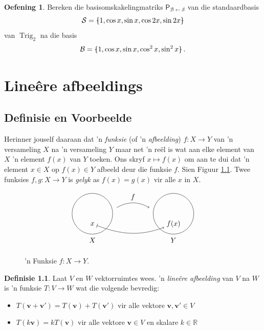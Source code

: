 \documentclass[a4paper,11pt]{book}
\theoremstyle{definition}
\newtheorem{definition}[theorem]{Definisie}
\newtheorem{exercise}{Oefening}
\newcommand{\ve}[1]{\mathbf{#1}}
\newcommand{\mat}[1]{\mathsf{#1}}
\newcommand{\basis}[1]{{\mathcal #1}}
\newcommand{\bmark}{\raisebox{.53ex}{\rule{.2em}{.1ex}}}
\newcommand{\bopen}{{\protect\ooalign{\{\cr\hfil\bmark\hfil\cr}}}
\newcommand{\bclose}{{\protect\ooalign{\}\cr\hfil\bmark\hfil\cr}}}
\DeclareMathOperator{\Trig}{Trig}
\begin{document}
\begin{exercise}
	Bereken die basisomskakelingmatriks $\mat{P}_{\basis{B} \leftarrow
	\basis{S}}$ van die standaardbasis
	\[
		\basis{S} = \bopen 1, \cos x, \sin x, \cos 2x, \sin 2x \bclose 
	\]
	van $\Trig_2$ na die basis 
	\[
		\basis{B} = \bopen 1, \cos x, \sin x, \cos^2 x, \sin^2 x \bclose \,
		.
	\]
\end{exercise}



\chapter{Line{\^e}re afbeeldings} \label{ACh3LinearMaps}

\section{Definisie en Voorbeelde}\label{ACh3Sec1DefinitionsExamples}

Herinner jouself daaraan dat 'n \emph{funksie} (of 'n \emph{afbeelding}) $f
: X \rightarrow Y$ van 'n versameling $X$ na 'n versameling $Y$ maar net
'n re{\"e}l is wat aan elke element van $X$ 'n element $f(x)$ van $Y$
toeken. Ons skryf $x \mapsto f(x)$ om aan te dui dat 'n element $x \in X$
op $f(x) \in Y$ afbeeld deur die funksie $f$.  Sien Figuur
\ref{explanation_of_mapsto}. Twee funksies $f, g : X \rightarrow Y$ is
\emph{gelyk} as $f(x) = g(x)$ vir alle $x$ in $X$. 



\begin{figure}[h]
	\[
		\begin{tikzpicture}
			\draw (-2, 0) circle (1);
			\draw (2,0) circle (1);
			\node at (-2, -1.3) {$X$};
			\node at (2, -1.3) {$Y$};
			\draw[->] (-0.8, 0.3) to[out=30, in=150] node[above] {$f$}
			(0.8, 0.3);
			\node (a) at (-2, -0.5) {$x$};
			\node (b) at (2, -0.5) {$f(x)$};
			\draw[|->] (a) to[out=-20, in=200] (b);	
		\end{tikzpicture}
	\]
	\caption{\label{explanation_of_mapsto} 'n Funksie $f : X \rightarrow
	Y$.}
\end{figure}



\begin{definition} Laat $V$ en $W$ vektorruimtes wees. 'n \emph{line{\^e}re
	afbeelding} van $V$ na $W$ is 'n funksie $T : V \rightarrow W$ wat die
	volgende bevredig:
	\begin{itemize}
		\item  $T(\ve{v} + \ve{v}') = T(\ve{v}) + T(\ve{v}')$ vir alle
			vektore $\ve{v}, \ve{v}' \in V$
		\item $T(k \ve{v}) = k T (\ve{v})$ vir alle vektore $\ve{v} \in V$
			en skalare $k \in \mathbb{R}$
	\end{itemize}
\end{definition}
\end{document}
